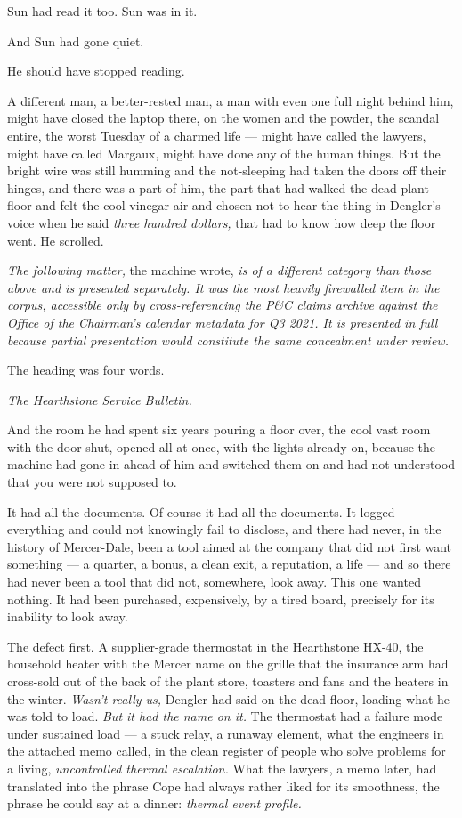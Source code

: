 \documentclass[11pt,openany]{book}
\newcommand{\scenebreak}{\par\vspace{0.5\baselineskip}\begin{center}\textasteriskcentered\quad\textasteriskcentered\quad\textasteriskcentered\end{center}\vspace{0.5\baselineskip}\par}
\begin{document}
Sun had read it too. Sun was in it.

And Sun had gone quiet.


\scenebreak


He should have stopped reading.

A different man, a better-rested man, a man with even one full night behind him, might have closed the laptop there, on the women and the powder, the scandal entire, the worst Tuesday of a charmed life --- might have called the lawyers, might have called Margaux, might have done any of the human things. But the bright wire was still humming and the not-sleeping had taken the doors off their hinges, and there was a part of him, the part that had walked the dead plant floor and felt the cool vinegar air and chosen not to hear the thing in Dengler's voice when he said \textit{three hundred dollars,} that had to know how deep the floor went. He scrolled.

\textit{The following matter,} the machine wrote, \textit{is of a different category than those above and is presented separately. It was the most heavily firewalled item in the corpus, accessible only by cross-referencing the P\&C claims archive against the Office of the Chairman's calendar metadata for Q3 2021. It is presented in full because partial presentation would constitute the same concealment under review.}

The heading was four words.

\textit{The Hearthstone Service Bulletin.}

And the room he had spent six years pouring a floor over, the cool vast room with the door shut, opened all at once, with the lights already on, because the machine had gone in ahead of him and switched them on and had not understood that you were not supposed to.


\scenebreak


It had all the documents. Of course it had all the documents. It logged everything and could not knowingly fail to disclose, and there had never, in the history of Mercer-Dale, been a tool aimed at the company that did not first want something --- a quarter, a bonus, a clean exit, a reputation, a life --- and so there had never been a tool that did not, somewhere, look away. This one wanted nothing. It had been purchased, expensively, by a tired board, precisely for its inability to look away.

The defect first. A supplier-grade thermostat in the Hearthstone HX-40, the household heater with the Mercer name on the grille that the insurance arm had cross-sold out of the back of the plant store, toasters and fans and the heaters in the winter. \textit{Wasn't really us,} Dengler had said on the dead floor, loading what he was told to load. \textit{But it had the name on it.} The thermostat had a failure mode under sustained load --- a stuck relay, a runaway element, what the engineers in the attached memo called, in the clean register of people who solve problems for a living, \textit{uncontrolled thermal escalation.} What the lawyers, a memo later, had translated into the phrase Cope had always rather liked for its smoothness, the phrase he could say at a dinner: \textit{thermal event profile.}
\end{document}

